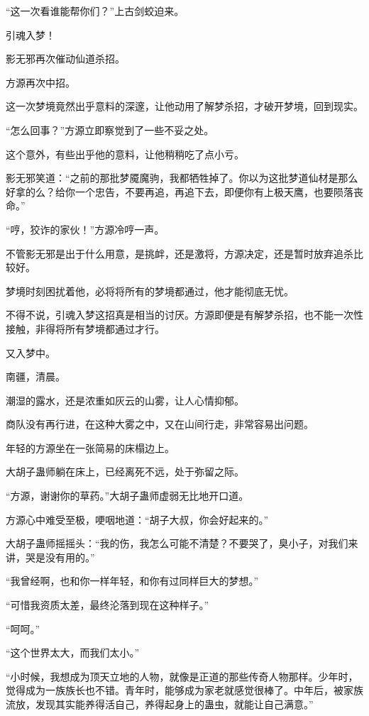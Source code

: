 \begin{this_body}
“这一次看谁能帮你们？”上古剑蛟迫来。

引魂入梦！

影无邪再次催动仙道杀招。

方源再次中招。

这一次梦境竟然出乎意料的深邃，让他动用了解梦杀招，才破开梦境，回到现实。

“怎么回事？”方源立即察觉到了一些不妥之处。

这个意外，有些出乎他的意料，让他稍稍吃了点小亏。

影无邪笑道：“之前的那批梦魇魔驹，我都牺牲掉了。你以为这批梦道仙材是那么好拿的么？给你一个忠告，不要再追，再追下去，即便你有上极天鹰，也要陨落丧命。”

“哼，狡诈的家伙！”方源冷哼一声。

不管影无邪是出于什么用意，是挑衅，还是激将，方源决定，还是暂时放弃追杀比较好。

梦境时刻困扰着他，必将将所有的梦境都通过，他才能彻底无忧。

不得不说，引魂入梦这招真是相当的讨厌。方源即便是有解梦杀招，也不能一次性接触，非得将所有梦境都通过才行。

又入梦中。

南疆，清晨。

潮湿的露水，还是浓重如灰云的山雾，让人心情抑郁。

商队没有再行进，在这种大雾之中，又在山间行走，非常容易出问题。

年轻的方源坐在一张简易的床榻边上。

大胡子蛊师躺在床上，已经离死不远，处于弥留之际。

“方源，谢谢你的草药。”大胡子蛊师虚弱无比地开口道。

方源心中难受至极，哽咽地道：“胡子大叔，你会好起来的。”

大胡子蛊师摇摇头：“我的伤，我怎么可能不清楚？不要哭了，臭小子，对我们来讲，哭是没有用的。”

“我曾经啊，也和你一样年轻，和你有过同样巨大的梦想。”

“可惜我资质太差，最终沦落到现在这种样子。”

“呵呵。”

“这个世界太大，而我们太小。”

“小时候，我想成为顶天立地的人物，就像是正道的那些传奇人物那样。少年时，觉得成为一族族长也不错。青年时，能够成为家老就感觉很棒了。中年后，被家族流放，发现其实能养得活自己，养得起身上的蛊虫，就能让自己满意。”


\end{this_body}
